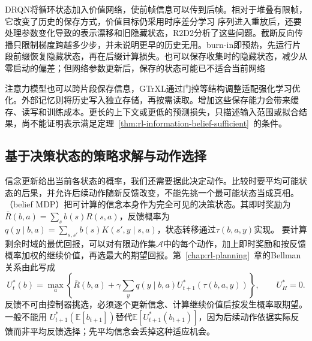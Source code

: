DRQN将循环状态加入价值网络，使前帧信息可以传到后帧。相对于堆叠有限帧，它改变了历史的保存方式，价值目标仍采用时序差分学习
序列进入重放后，还要处理参数变化导致的表示漂移和旧隐藏状态，R2D2分析了这些问题。截断反向传播只限制梯度跨越多少步，并未说明更早的历史无用。burn-in即预热，先运行片段前缀恢复隐藏状态，再在后缀计算损失。也可以保存收集时的隐藏状态，减少从零启动的偏差；但网络参数更新后，保存的状态可能已不适合当前网络

注意力模型也可以跨片段保存信息，GTrXL通过门控等结构调整适配强化学习优化。外部记忆则将历史写入独立存储，再按需读取。增加这些保存能力会带来缓存、读写和训练成本。更长的上下文或更低的预测损失，只描述输入范围或拟合结果，尚不能证明表示满足定理~\ref{thm:rl-information-belief-sufficient}~的条件。

\subsection{基于决策状态的策略求解与动作选择}
\label{sec:rl-information-belief-control}

信念更新给出当前各状态的概率，我们还需要据此决定动作。比较时要平均可能状态的后果，并允许后续动作随新反馈改变，不能先挑一个最可能状态当成真相。（belief MDP）把可计算的信念本身作为完全可见的决策状态。其即时奖励为
$\bar R(b,a)=\sum_s b(s)R(s,a)$，反馈概率为
$q(y\mid b,a)=\sum_{s,s'}b(s)K(s',y\mid s,a)$，状态转移通过$\tau(b,a,y)$实现。
要计算剩余时域的最优回报，可以对有限动作集$\mathcal A$中的每个动作，加上即时奖励和按反馈概率加权的继续价值，再选最大的期望回报。第~\ref{chap:rl-planning}~章的Bellman关系由此写成
\begin{equation}
  \label{eq:rl-information-belief-bellman}
  U_t^*(b)=\max_a\left\{
    \bar R(b,a)+\gamma\sum_yq(y\mid b,a)
                    U_{t+1}^*(\tau(b,a,y))\right\},
  \qquad U_H^*=0.
\end{equation}
反馈不可由控制器挑选，必须逐个更新信念、计算继续价值后按发生概率取期望。一般不能用
$U_{t+1}^*(\mathbb E[b_{t+1}])$替代$\mathbb E[U_{t+1}^*(b_{t+1})]$，因为后续动作依据实际反馈而非平均反馈选择；先平均信念会丢掉这种适应机会。

